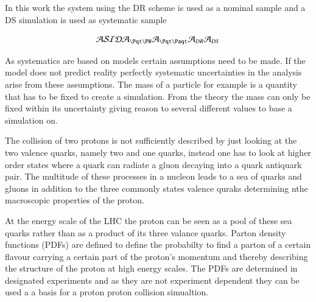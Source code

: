 In this work the system using the DR scheme is used as a nominal sample and a DS simulation is used as systematic sample

\begin{align}
\Aamp \Samp \Iamp \Damp \Atw \Att \ADR \ADS
\end{align}



As systematics are based on models certain assumptions need to be made. If the model does not predict reality perfectly systematic uncertainties in the analysis arise from these assumptions. The mass of a particle for example is a quantity that has to be fixed to create a simulation. From the theory the mass can only be fixed within its uncertainty giving reason to several different values to base a simulation on.


The collision of two protons is not sufficiently described by just looking at the two valence quarks, namely two \Pup and one \Pdown quarks, instead one has to look at higher order states where a quark can radiate a gluon decaying into a quark antiquark pair. The multitude of these processes in a nucleon leads to a sea of quarks and gluons in addition to the three commonly states valence quraks determining nthe macroscopic properties of the proton.

At the energy scale of the LHC the proton can be seen as a pool of these sea quarks rather than as a product of its three valance quarks. Parton density functions (PDFs) are defined to define the probabilty to find a parton of a certain flavour carrying a certain part of the proton's momentum and thereby describing the structure of the proton at high energy scales. The PDFs are determined in designated experiments and as they are not experiment dependent they can be used a a basis for a proton proton collision simualtion.

